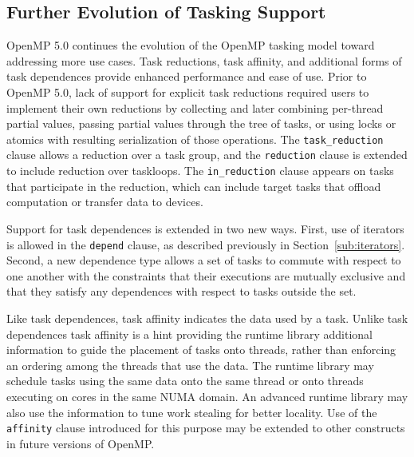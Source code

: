 \subsection{Further Evolution of Tasking Support}
\label{sub:new_tasking}


OpenMP 5.0 continues the evolution of the OpenMP tasking model toward 
addressing more use cases.  Task reductions, task affinity, and 
additional forms of task dependences provide enhanced performance and 
ease of use.  Prior to OpenMP 5.0, lack of support for explicit task 
reductions required users to implement their own reductions by 
collecting and later combining per-thread partial values, passing 
partial values through the tree of tasks, or using locks or atomics 
with resulting serialization of those operations.  The 
\texttt{task\_reduction} clause allows a reduction over a task group, 
and the \texttt{reduction} clause is extended to include reduction 
over taskloops.  The \texttt{in\_reduction} clause appears on tasks that 
participate in the reduction, which can include target tasks that 
offload computation or transfer data to devices.

Support for task dependences is extended in two new ways.  First, use 
of iterators is allowed in the \texttt{depend} clause, as described 
previously in Section~\ref{sub:iterators}. Second, a new dependence type 
allows a set of tasks to commute with respect to one another with the 
constraints that their executions are mutually exclusive and that 
they satisfy any dependences with respect to tasks outside the set.

Like task dependences, task affinity indicates the data used by a task. 
Unlike task dependences task affinity is a hint providing the runtime 
library additional information to guide the placement of tasks onto 
threads, rather than enforcing an ordering among the threads that use 
the data.  The runtime library may schedule tasks using the same data 
onto the same thread or onto threads executing on cores in the same 
NUMA  domain.  An advanced runtime library may also use the information 
to tune work stealing for better locality. Use of the \texttt{affinity} 
clause introduced for this purpose may be extended to other constructs 
in future versions of OpenMP.


